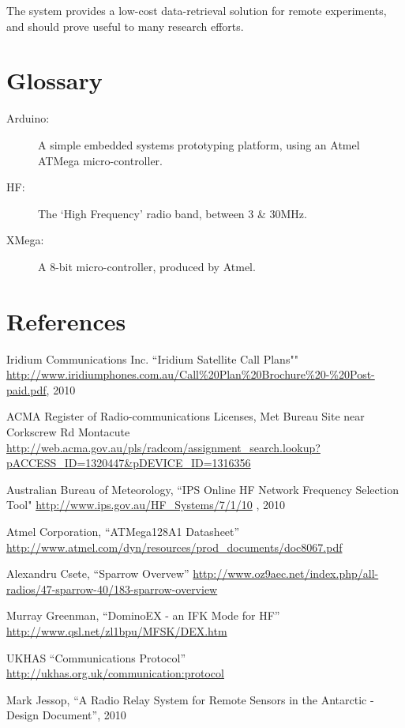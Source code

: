 \documentclass[a4paper,12pt]{article}
\begin{document}
The system provides a low-cost data-retrieval solution for remote experiments, and should prove useful to many research efforts.


\newpage
\section*{Glossary}
\begin{description}
\item[Arduino:] A simple embedded systems prototyping platform, using an Atmel ATMega micro-controller.
\item[HF:] The `High Frequency' radio band, between 3 \& 30MHz.
\item[XMega:] A 8-bit micro-controller, produced by Atmel.
\end{description}

\section*{References}
\renewcommand*{\refname}{\vspace*{-12mm}}
\begin{thebibliography}{99}
Iridium Communications Inc. ``Iridium Satellite Call Plans"" \url{http://www.iridiumphones.com.au/Call\%20Plan\%20Brochure\%20-\%20Post-paid.pdf}, 2010

ACMA Register of Radio-communications Licenses, Met Bureau Site near Corkscrew Rd Montacute \url{http://web.acma.gov.au/pls/radcom/assignment\_search.lookup?pACCESS\_ID=1320447&pDEVICE\_ID=1316356}

Australian Bureau of Meteorology, ``IPS Online HF Network Frequency Selection Tool" \url{http://www.ips.gov.au/HF\_Systems/7/1/10} , 2010 %

Atmel Corporation, ``ATMega128A1 Datasheet'' \url{http://www.atmel.com/dyn/resources/prod_documents/doc8067.pdf}

Alexandru Csete, ``Sparrow Overvew'' \url{http://www.oz9aec.net/index.php/all-radios/47-sparrow-40/183-sparrow-overview}

Murray Greenman, ``DominoEX - an IFK Mode for HF'' 
\url{http://www.qsl.net/zl1bpu/MFSK/DEX.htm}

UKHAS ``Communications Protocol''
\url{http://ukhas.org.uk/communication:protocol}

Mark Jessop, ``A Radio Relay System for Remote Sensors in the Antarctic - Design Document'', 2010

\end{thebibliography}
\end{document}
